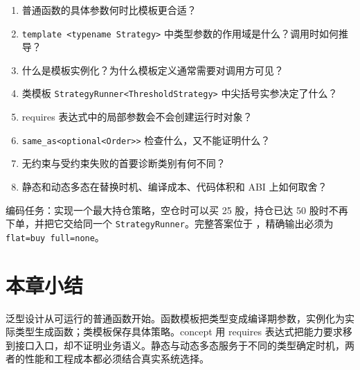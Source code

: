 \begin{enumerate}
  \item 普通函数的具体参数何时比模板更合适？
  \item \texttt{template <typename Strategy>} 中类型参数的作用域是什么？调用时如何推导？
  \item 什么是模板实例化？为什么模板定义通常需要对调用方可见？
  \item 类模板 \texttt{StrategyRunner<ThresholdStrategy>} 中尖括号实参决定了什么？
  \item requires 表达式中的局部参数会不会创建运行时对象？
  \item \texttt{same\_as<optional<Order>>} 检查什么，又不能证明什么？
  \item 无约束与受约束失败的首要诊断类别有何不同？
  \item 静态和动态多态在替换时机、编译成本、代码体积和 ABI 上如何取舍？
\end{enumerate}

编码任务：实现一个最大持仓策略，空仓时可以买 25 股，持仓已达 50 股时不再下单，并把它交给同一个 \texttt{StrategyRunner}。完整答案位于 ，精确输出必须为 \texttt{flat=buy full=none}。


\section{本章小结}

泛型设计从可运行的普通函数开始。函数模板把类型变成编译期参数，实例化为实际类型生成函数；类模板保存具体策略。concept 用 requires 表达式把能力要求移到接口入口，却不证明业务语义。静态与动态多态服务于不同的类型确定时机，两者的性能和工程成本都必须结合真实系统选择。

